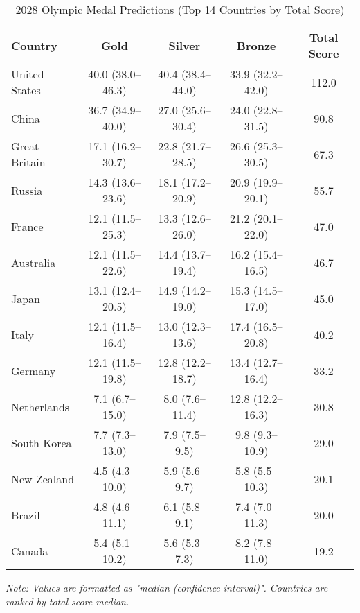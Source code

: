 \begin{table}[H]
\centering
\caption{2028 Olympic Medal Predictions (Top 14 Countries by Total Score)}
\vspace{-6pt} 
\label{tab:top14_medals}
\begin{tabular}{l|ccc|c} %
\toprule
\textbf{Country} & \textbf{Gold} & \textbf{Silver} & \textbf{Bronze} & \textbf{Total Score} \\
\midrule
United States         & 40.0 (38.0--46.3) & 40.4 (38.4--44.0) & 33.9 (32.2--42.0) & 112.0  \\
China                 & 36.7 (34.9--40.0) & 27.0 (25.6--30.4) & 24.0 (22.8--31.5) & 90.8    \\
Great Britain         & 17.1 (16.2--30.7) & 22.8 (21.7--28.5) & 26.6 (25.3--30.5) & 67.3     \\
Russia                & 14.3 (13.6--23.6) & 18.1 (17.2--20.9) & 20.9 (19.9--20.1) & 55.7    \\
France                & 12.1 (11.5--25.3) & 13.3 (12.6--26.0) & 21.2 (20.1--22.0) & 47.0    \\
Australia             & 12.1 (11.5--22.6) & 14.4 (13.7--19.4) & 16.2 (15.4--16.5) & 46.7    \\
Japan                 & 13.1 (12.4--20.5) & 14.9 (14.2--19.0) & 15.3 (14.5--17.0) & 45.0     \\
Italy                 & 12.1 (11.5--16.4) & 13.0 (12.3--13.6) & 17.4 (16.5--20.8) & 40.2     \\
Germany               & 12.1 (11.5--19.8) & 12.8 (12.2--18.7) & 13.4 (12.7--16.4) & 33.2     \\
Netherlands           & 7.1 (6.7--15.0)   & 8.0 (7.6--11.4)   & 12.8 (12.2--16.3) & 30.8     \\
South Korea           & 7.7 (7.3--13.0)   & 7.9 (7.5--9.5)    & 9.8 (9.3--10.9)   & 29.0    \\
New Zealand           & 4.5 (4.3--10.0)   & 5.9 (5.6--9.7)    & 5.8 (5.5--10.3)   & 20.1     \\
Brazil                & 4.8 (4.6--11.1)   & 6.1 (5.8--9.1)    & 7.4 (7.0--11.3)   & 20.0     \\
Canada                & 5.4 (5.1--10.2)   & 5.6 (5.3--7.3)    & 8.2 (7.8--11.0)   & 19.2    \\
\bottomrule
\end{tabular}
\smallskip
\vspace{2pt}
\footnotesize \textit{Note: Values are formatted as "median (confidence interval)". Countries are ranked by total score median.}
\end{table}


